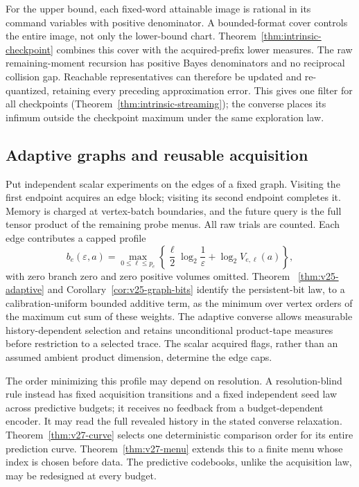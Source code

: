 For the upper bound, each fixed-word attainable image is rational in
its command variables with positive denominator. A bounded-format
cover controls the entire image, not only the lower-bound chart.
Theorem~\ref{thm:intrinsic-checkpoint} combines this cover with the
acquired-prefix lower measures. The raw remaining-moment recursion
has positive Bayes denominators and no reciprocal collision gap.
Reachable representatives can therefore be updated and re-quantized,
retaining every preceding approximation error. This gives one filter
for all checkpoints (Theorem~\ref{thm:intrinsic-streaming}); the
converse places its infimum outside the checkpoint maximum under the
same exploration law.

\subsection{Adaptive graphs and reusable acquisition}
Put independent scalar experiments on the edges of a fixed graph.
Visiting the first endpoint acquires an edge block; visiting its second
endpoint completes it. Memory is charged at vertex-batch boundaries,
and the future query is the full tensor product of the remaining probe
menus. All raw trials are counted. Each edge contributes a capped
profile
\[
 b_e(\varepsilon,a)=\max_{0\le\ell\le p_e}
       \left\{\frac{\ell}{2}\log_2\frac1\varepsilon
                           +\log_2V_{e,\ell}(a)\right\},
\]
with zero branch zero and zero positive volumes omitted. Theorem~
\ref{thm:v25-adaptive} and Corollary~\ref{cor:v25-graph-bits} identify
the persistent-bit law, to a calibration-uniform bounded additive term,
as the minimum over vertex orders of the maximum cut sum of these
weights. The adaptive converse allows measurable history-dependent
selection and retains unconditional product-tape measures before
restriction to a selected trace. The scalar acquired flags, rather than
an assumed ambient product dimension, determine the edge caps.

The order minimizing this profile may depend on resolution. A
resolution-blind rule instead has fixed acquisition transitions and a
fixed independent seed law across predictive budgets; it receives no
feedback from a budget-dependent encoder. It may read the full revealed
history in the stated converse relaxation. Theorem~\ref{thm:v27-curve}
selects one deterministic comparison order for its entire prediction
curve. Theorem~\ref{thm:v27-menu} extends this to a finite menu whose
index is chosen before data. The predictive codebooks, unlike the
acquisition law, may be redesigned at every budget.

